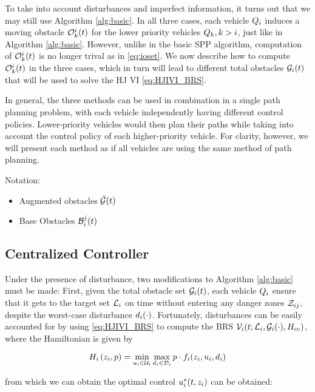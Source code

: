 To take into account disturbances and imperfect information, it turns out that we may still use Algorithm \ref{alg:basic}. In all three cases, each vehicle $Q_{i}$ induces a moving obstacle $\mathcal{O}_k^i(t)$ for the lower priority vehicles $Q_{k}, k>i$, just like in Algorithm \ref{alg:basic}. However, unlike in the basic SPP algorithm, computation of $\mathcal{O}_k^i(t)$ is no longer trival as in \eqref{eq:ioset}. We now describe how to compute $\mathcal{O}_k^i(t)$ in the three cases, which in turn will lead to different total obstacles $\mathcal{G}_i(t)$ that will be used to solve the HJ VI \eqref{eq:HJIVI_BRS}.

In general, the three methods can be used in combination in a single path planning problem, with each vehicle independently having different control policies. Lower-priority vehicles would then plan their paths while taking into account the control policy of each higher-priority vehicle. For clarity, however, we will present each method as if all vehicles are using the same method of path planning.

Notation:
\begin{itemize}
\item Augmented obstacles $\tilde{\mathcal{G}}(t)$
\item Base Obstacles $\mathcal{B}_i^j(t)$
\end{itemize}

\subsection{Centralized Controller} \label{sec:incomp_optctrl}
Under the presence of disturbance, two modifications to Algorithm \ref{alg:basic} must be made: First, given the total obstacle set $\mathcal{G}_i(t)$, each vehicle $Q_{i}$ ensure that it gets to the target set $\mathcal{L}_i$ on time without entering any danger zones $\mathcal{Z}_{ij}$, despite the worst-case disturbance $d_i(\cdot)$. Fortunately, disturbances can be easily accounted for by using \eqref{eq:HJIVI_BRS} to compute the BRS $\mathcal{V}_i(t; \mathcal{L}_i, \mathcal{G}_i(\cdot), H_{\text{cc}})$, where the Hamiltonian is given by

\begin{equation}
H_i\left(z_i, p\right) = \min_{u_i \in \mathcal{U}_i} \max_{d_i \in \mathcal{D}_i} p \cdot f_i(z_i, u_i, d_i)
\end{equation}

\noindent from which we can obtain the optimal control $u_i^*(t, z_i)$ can be obtained:

